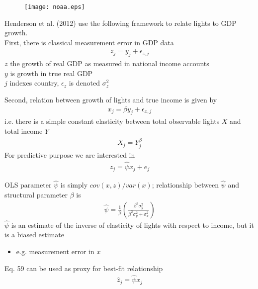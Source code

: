 \documentclass{beamer}
\begin{document}
\begin{frame}
  \begin{figure}
    \texttt{[image: noaa.eps]}
  \end{figure}
\end{frame}

\begin{frame}
  Henderson et al. (2012) use the following framework to relate lights to GDP growth.\\
  First, there is classical measurement error in GDP data
  \begin{align}
    z_j= y_j+\epsilon_{z,j}
  \end{align}
  $z$ the growth of real GDP as measured in national income accounts\\
  $y$ is growth in true real GDP\\
  $j$ indexes country, $\epsilon_z$ is denoted $\sigma^2_z$
\end{frame}

\begin{frame}
  Second, relation between growth of lights and true income is given by
  \begin{align}
    x_j=\beta y_j + \epsilon_{x,j}
  \end{align}
  \medskip
  i.e. there is a simple constant elasticity between total observable lights $X$ and total income $Y$
  \begin{align}
    X_j=Y_j^{\beta}
  \end{align}
  \medskip
  For predictive purpose we are interested in
  \begin{align}
    z_j=\hat{\psi} x_j + e_j
  \end{align}
\end{frame}

\begin{frame}
 OLS parameter $\hat{\psi}$ is simply $cov(x,z)/ var(x)$; relationship between $\hat{\psi}$ and structural parameter $\beta$ is
 \begin{align}
   \hat{\psi} = \frac{1}{\beta} \left( \frac{\beta^2 \sigma^2_y}{\beta^2 \sigma^2_y + \sigma^2_x}     \right)
 \end{align}
 \medskip
 $\hat{\psi}$ is an estimate of the inverse of elasticity of lights with respect to income, but it is a biased estimate
 \begin{itemize}
   \item e.g. measurement error in $x$
 \end{itemize}
 Eq. 59 can be used as proxy for best-fit relationship
 \begin{align}
   \hat{z}_j=\hat{\psi}x_j
 \end{align}  
\end{frame}
\end{document}
